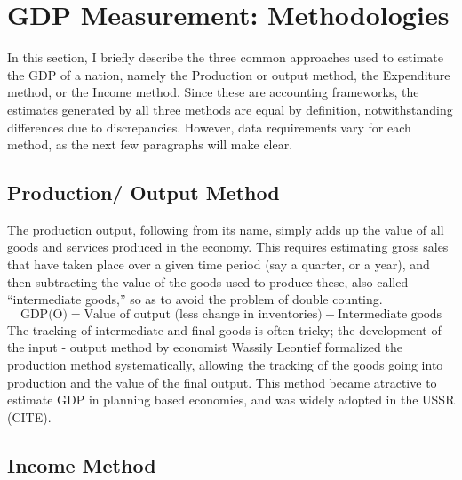 \documentclass[12pt,nobind, a4paper]{reedthesis}
\begin{document}
 \hypertarget{gdp-measurement-methodologies}{%
 \section{GDP Measurement: Methodologies}\label{gdp-measurement-methodologies}}

 In this section, I briefly describe the three common approaches used to estimate the GDP of a nation, namely the Production or output method, the Expenditure method, or the Income method. Since these are accounting frameworks, the estimates generated by all three methods are equal by definition, notwithstanding differences due to discrepancies. However, data requirements vary for each method, as the next few paragraphs will make clear.

 \hypertarget{production-output-method}{%
 \subsection{Production/ Output Method}\label{production-output-method}}

 The production output, following from its name, simply adds up the value of all goods and services produced in the economy. This requires estimating gross sales that have taken place over a given time period (say a quarter, or a year), and then subtracting the value of the goods used to produce these, also called ``intermediate goods,'' so as to avoid the problem of double counting.
 \begin{equation}
 \text{GDP(O)}= \text{Value of output (less change in inventories)} - \text{Intermediate goods}
 \end{equation}
 The tracking of intermediate and final goods is often tricky; the development of the input - output method by economist Wassily Leontief formalized the production method systematically, allowing the tracking of the goods going into production and the value of the final output. This method became atractive to estimate GDP in planning based economies, and was widely adopted in the USSR (CITE).

 \hypertarget{income-method}{%
 \subsection{Income Method}\label{income-method}}
\end{document}
